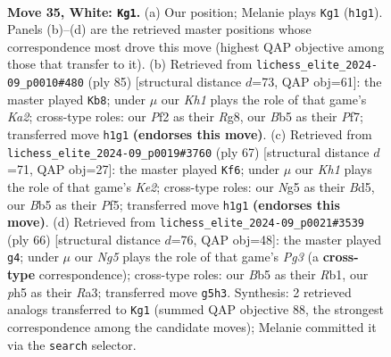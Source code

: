 \documentclass[11pt]{article}
\begin{document}
\clearpage

\begin{figure}[p]\centering
\begin{subfigure}{0.46\textwidth}\centering
\resizebox{\linewidth}{!}{%
\newchessgame
\chessboard[
  setfen={2b2k2/r4p2/3q1np1/1B4Np/P7/1p4P1/3NRP1P/R6K w - - 4 35},
  showmover=false,
  pgfstyle=straightmove, color=movearrow, markmove={h1-g1}
]}
\caption{}
\end{subfigure}\hfill
\begin{subfigure}{0.46\textwidth}\centering
\resizebox{\linewidth}{!}{%
\newchessgame
\chessboard[
  setfen={6rr/kp3p2/2p1b1n1/3pP3/3P3p/3B1P2/PP4PR/K1Q5 b - - 1 43},
  showmover=false,
  pgfstyle=straightmove, color=movearrow, markmove={a7-b8}
]}
\caption{}
\end{subfigure}
\\[4pt]
\begin{subfigure}{0.46\textwidth}\centering
\resizebox{\linewidth}{!}{%
\newchessgame
\chessboard[
  setfen={3r4/2p1kr2/Q3p3/3b1p2/2n4P/8/PpP2PP1/1K2R3 b - - 2 34},
  showmover=false,
  pgfstyle=straightmove, color=movearrow, markmove={e7-f6}
]}
\caption{}
\end{subfigure}\hfill
\begin{subfigure}{0.46\textwidth}\centering
\resizebox{\linewidth}{!}{%
\newchessgame
\chessboard[
  setfen={2r3k1/1q2ppb1/3p2p1/8/1P5p/R3BnPP/5P2/1R1Q1K2 w - - 0 34},
  showmover=false,
  pgfstyle=straightmove, color=movearrow, markmove={g3-g4}
]}
\caption{}
\end{subfigure}
\caption{\textbf{Move 35, White: \texttt{Kg1}.} (a) Our position; Melanie plays \texttt{Kg1} (\texttt{h1g1}). Panels (b)--(d) are the retrieved master positions whose correspondence most drove this move (highest QAP objective among those that transfer to it). (b) Retrieved from \texttt{lichess\_elite\_2024-09\_p0010\#480} (ply 85) [structural distance $d$=73, QAP obj=61]: the master played \texttt{Kb8}; under $\mu$ our \emph{Kh1} plays the role of that game's \emph{Ka2}; cross-type roles: our \emph{P}f2 as their \emph{R}g8, our \emph{B}b5 as their \emph{P}f7; transferred move \texttt{h1g1} \textbf{(endorses this move)}. (c) Retrieved from \texttt{lichess\_elite\_2024-09\_p0019\#3760} (ply 67) [structural distance $d$=71, QAP obj=27]: the master played \texttt{Kf6}; under $\mu$ our \emph{Kh1} plays the role of that game's \emph{Ke2}; cross-type roles: our \emph{N}g5 as their \emph{B}d5, our \emph{B}b5 as their \emph{P}f5; transferred move \texttt{h1g1} \textbf{(endorses this move)}. (d) Retrieved from \texttt{lichess\_elite\_2024-09\_p0021\#3539} (ply 66) [structural distance $d$=76, QAP obj=48]: the master played \texttt{g4}; under $\mu$ our \emph{Ng5} plays the role of that game's \emph{Pg3} (a \textbf{cross-type} correspondence); cross-type roles: our \emph{B}b5 as their \emph{R}b1, our \emph{p}h5 as their \emph{R}a3; transferred move \texttt{g5h3}. Synthesis: 2 retrieved analogs transferred to \texttt{Kg1} (summed QAP objective 88, the strongest correspondence among the candidate moves); Melanie committed it via the \texttt{search} selector.}
\label{fig:thought-m68}
\end{figure}
\end{document}
